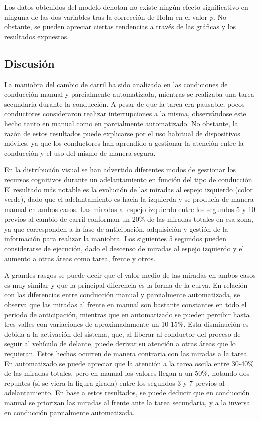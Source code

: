 Los datos obtenidos del modelo denotan no existe ningún efecto significativo en ninguna de las dos variables tras la corrección de Holm en el valor \emph{p}. No obstante, se pueden apreciar ciertas tendencias a través de las gráficas y los resultados expuestos.

\subsection{Discusión}\label{324}

La maniobra del cambio de carril ha sido analizada en las condiciones de conducción manual y parcialmente automatizada, mientras se realizaba una tarea secundaria durante la conducción. A pesar de que la tarea era pausable, pocos conductores consideraron realizar interrupciones a la misma, observándose este hecho tanto en manual como en parcialmente automatizado. No obstante, la razón de estos resultados puede explicarse por el uso habitual de dispositivos móviles, ya que los conductores han aprendido a gestionar la atención entre la conducción y el uso del mismo de manera segura. 

En la distribución visual se han advertido diferentes modos de gestionar los recursos cognitivos durante un adelantamiento en función del tipo de conducción. El resultado más notable es la evolución de las miradas al espejo izquierdo (color verde), dado que el adelantamiento es hacia la izquierda y se producía de manera manual en ambos casos. Las miradas al espejo izquierdo entre los segundos 5 y 10 previos al cambio de carril conforman un 20\% de las miradas totales en esa zona, ya que corresponden a la fase de anticipación, adquisición y gestión de la información para realizar la maniobra. Los siguientes 5 segundos pueden considerarse de ejecución, dado el descenso de miradas al espejo izquierdo y el aumento a otras áreas como tarea, frente y otros. 

A grandes rasgos se puede decir que el valor medio de las miradas en ambos casos es muy similar y que la principal diferencia es la forma de la curva. En relación con las diferencias entre conducción manual y parcialmente automatizada, se observa que las miradas al frente en manual son bastante constantes en todo el periodo de anticipación, mientras que en automatizado se pueden percibir hasta tres valles con variaciones de aproximadamente un 10-15\%. Esta disminución es debida a la activación del sistema, que, al liberar al conductor del proceso de seguir al vehículo de delante, puede derivar su atención a otras áreas que lo requieran. Estos hechos ocurren de manera contraria con las miradas a la tarea. En automatizado se puede apreciar que la atención a la tarea oscila entre 30-40\% de las miradas totales, pero en manual los valores llegan a un 50\%, notando dos repuntes (si se viera la figura girada) entre los segundos 3 y 7 previos al adelantamiento. En base a estos resultados, se puede deducir que en conducción manual se priorizan las miradas al frente ante la tarea secundaria, y a la inversa en conducción parcialmente automatizada.

